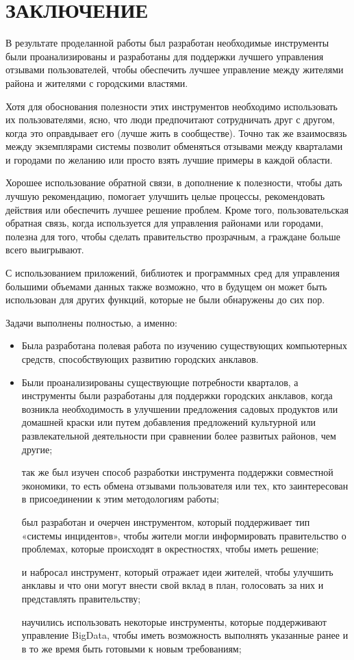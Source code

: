 \chapter{ЗАКЛЮЧЕНИЕ}


В результате проделанной работы был разработан необходимые инструменты были проанализированы и разработаны для поддержки лучшего управления отзывами пользователей, чтобы обеспечить лучшее управление между жителями района и жителями с городскими властями.


Хотя для обоснования полезности этих инструментов необходимо использовать их пользователями, ясно, что люди предпочитают сотрудничать друг с другом, когда это оправдывает его (лучше жить в сообществе).
Точно так же взаимосвязь между экземплярами системы позволит обменяться отзывами между кварталами и городами по желанию или просто взять лучшие примеры в каждой области.


Хорошее использование обратной связи, в дополнение к полезности, чтобы дать лучшую рекомендацию, помогает улучшить целые процессы, рекомендовать действия или обеспечить лучшее решение проблем. Кроме того, пользовательская обратная связь, когда используется для управления районами или городами, полезна для того, чтобы сделать правительство прозрачным, а граждане больше всего выигрывают.

С использованием приложений, библиотек и программных сред для управления большими объемами данных также возможно, что в будущем он может быть использован для других функций, которые не были обнаружены до сих пор.


Задачи выполнены полностью, а именно:
\begin{itemize}
\item Была разработана полевая работа по изучению существующих компьютерных средств, способствующих развитию городских анклавов.

\item Были проанализированы существующие потребности кварталов, а инструменты были разработаны для поддержки городских анклавов, когда возникла необходимость в улучшении предложения садовых продуктов или домашней краски или путем добавления предложений культурной или развлекательной деятельности при сравнении более развитых районов, чем другие;

 так же был изучен способ разработки инструмента поддержки совместной экономики, то есть обмена отзывами пользователя или тех, кто заинтересован в присоединении к этим методологиям работы;

 был разработан и очерчен инструментом, который поддерживает тип «системы инцидентов», чтобы жители могли информировать правительство о проблемах, которые происходят в окрестностях, чтобы иметь решение;

 и набросал инструмент, который отражает идеи жителей, чтобы улучшить анклавы и что они могут внести свой вклад в план, голосовать за них и представлять правительству;

 научились использовать некоторые инструменты, которые поддерживают управление BigData, чтобы иметь возможность выполнять указанные ранее и в то же время быть готовыми к новым требованиям;

\end{itemize}